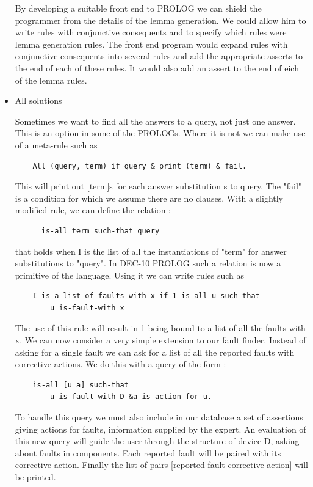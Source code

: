 \documentclass[14pt]{article}
\begin{document}
\begin{itemize}
By developing a suitable front end to PROLOG we can shield the programmer from the details of the lemma generation. We could allow him to write rules with conjunctive consequents and to specify which rules were lemma generation rules. The front end program would expand rules with conjunctive consequents into several rules and add the appropriate asserts to the end of each of these rules. It would also add an assert to the end of eich of the lemma rules.

\item All solutions 

Sometimes we want to find all the answers to a query, not just one answer. This is an option in some of the PROLOGs. Where it is not we can make use of a meta-rule such as 
\begin{verbatim}
	All (query, term) if query & print (term) & fail.
\end{verbatim}
This will print out [term]s for each answer substitution s to query. 
The "fail" is a condition for which we assume there are no clauses. 
With a slightly modified rule, we can define the relation :
\begin{verbatim}	
	  is-all term such-that query 
\end{verbatim}
that holds when I is the list of all the instantiations of "term" for answer substitutions to "query". In DEC-10 PROLOG such a relation is now a primitive of the language. Using it we can write rules such as 
\begin{verbatim}
	I is-a-list-of-faults-with x if 1 is-all u such-that 
		u is-fault-with x 
\end{verbatim}
The use of this rule will result in 1 being bound to a list of all the 
faults with x. We can now consider a very simple extension to our fault 
finder. Instead of asking for a single fault we can ask for a list of all the reported faults with corrective actions. We do this with a query of the form : 
\begin{verbatim}
	is-all [u a] such-that 
		u is-fault-with D &a is-action-for u. 
\end{verbatim}

To handle this query we must also include in our database a set of assertions giving actions for faults, information supplied by the expert. An evaluation of this new query will guide the user through the structure of device D, asking about faults in components. Each reported fault will be paired with its corrective action. Finally the list of pairs [reported-fault corrective-action] will be printed.


\end{itemize}
\end{document}
